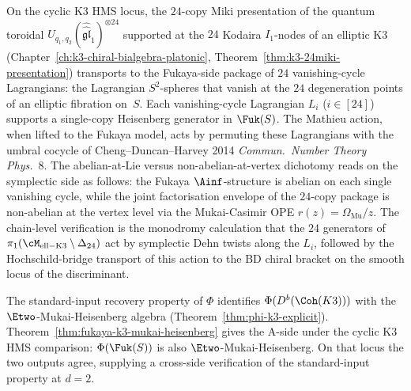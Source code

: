 \begin{remark}
\label{rem:fuk-24-vanishing-cycles}
On the cyclic K3 HMS locus, the $24$-copy Miki presentation of the
quantum toroidal
$U_{q_1,q_2}(\hat{\hat{\mathfrak{gl}}}_1)^{\otimes 24}$ supported
at the $24$ Kodaira $I_1$-nodes of an elliptic K3
(Chapter~\ref{ch:k3-chiral-bialgebra-platonic},
Theorem~\ref{thm:k3-24miki-presentation}) transports to the
Fukaya-side package of $24$ vanishing-cycle Lagrangians: the
Lagrangian $S^2$-spheres that vanish at the $24$ degeneration points
of an elliptic fibration on~$S$. Each vanishing-cycle Lagrangian
$L_i$ ($i \in [24]$) supports a single-copy Heisenberg generator in
$\Fuk(S)$. The Mathieu action, when lifted to the Fukaya model, acts
by permuting these Lagrangians with the umbral cocycle of
Cheng--Duncan--Harvey 2014 \textit{Commun.~Number Theory Phys.}~8.
The abelian-at-Lie versus non-abelian-at-vertex dichotomy reads on
the symplectic side as follows: the Fukaya $\Ainf$-structure is
abelian on each single vanishing cycle, while the joint
factorisation envelope of the $24$-copy package is non-abelian at
the vertex level via the Mukai-Casimir OPE
$r(z) = \Omega_{\mathrm{Mu}}/z$. The chain-level verification is the
monodromy calculation that the $24$ generators of
$\pi_1(\cM_{\mathrm{ell-K3}} \setminus \Delta_{24})$ act by
symplectic Dehn twists along the $L_i$, followed by the
Hochschild-bridge transport of this action to the BD chiral bracket
on the smooth locus of the discriminant.
\end{remark}

\begin{remark}[Cross-side verification at \texorpdfstring{$d = 2$}{d = 2}]
\label{rem:phi-u4-fukaya-side}
The standard-input recovery property of $\Phi$ identifies
$\Phi(D^b(\Coh(K3)))$ with the $\Etwo$-Mukai-Heisenberg algebra
(Theorem~\ref{thm:phi-k3-explicit}).
Theorem~\ref{thm:fukaya-k3-mukai-heisenberg} gives the A-side under
the cyclic K3 HMS comparison: $\Phi(\Fuk(S))$ is also
$\Etwo$-Mukai-Heisenberg. On that locus the two outputs agree,
supplying a cross-side verification of the standard-input property
at $d = 2$.
\end{remark}

